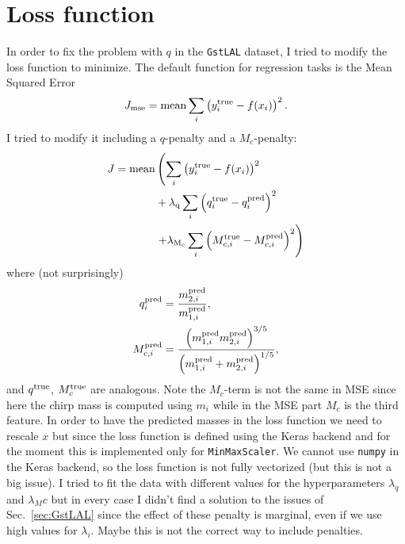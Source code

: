 \documentclass[prd,aps,twocolumn,a4paper,showkeys,nofootinbib]{article}
\begin{document}
\section{Loss function}
\label{sec:loss}
In order to fix the problem with $q$ in the \texttt{GstLAL} dataset, 
I tried to modify the loss function to minimize.
The default function for regression tasks is the Mean Squared Error
\begin{equation}
J_{\rm mse} = {\rm mean} \sum_i \left( y^{\rm true}_i - f(x_i) \right)^2 .
\end{equation}
I tried to modify it including a $q$-penalty and a $M_c$-penalty:
\begin{align}
J =  {\rm mean} & \left(  \sum_i \left( y^{\rm true}_i - f(x_i) \right)^2 \right.   \nonumber \\
&  + \lambda_{\rm q} \sum_i \left( q^{\rm true}_i - q^{\rm pred}_i \right)^2
\nonumber \\
& \left. + \lambda_{\rm M_c} \sum_i \left( M_{c,i}^{\rm true} - M_{c,i}^{\rm pred} \right)^2 \right)
\end{align}
where (not surprisingly)
\begin{align}
q^{\rm pred}_i &  = \frac{m_{2,i}^{\rm pred}}{m_{1,i}^{\rm pred}}, \\
M_{c,i}^{\rm pred} & = 
\frac{\left(m_{1,i}^{\rm pred}m_{2,i}^{\rm pred} \right)^{3/5}}{\left(m_{1,i}^{\rm pred}+m_{2,i}^{\rm pred}\right)^{1/5}},
\end{align}
and $q^{\rm true}$, $M_c^{\rm true}$ are analogous. Note the $M_c$-term is not the same 
in MSE since here the chirp mass is computed using $m_i$ while in the MSE part $M_c$ 
is the third feature.
In order to have the predicted masses in the loss function we need to 
rescale $x$ but since the loss function is defined using the Keras backend and 
for the moment this is implemented only for  \texttt{MinMaxScaler}. 
We cannot use \texttt{numpy} in the Keras backend, so the loss function is not fully vectorized
(but this is not a big issue). 
I tried to fit the data with different values for the hyperparameters $\lambda_q$ and
$\lambda_Mc$ but in every case I didn't find a solution to the issues of Sec.~\ref{sec:GstLAL}
since the effect of these penalty is marginal, even if we use high values for $\lambda_i$.
Maybe this is not the correct way to include penalties.

\end{document}
